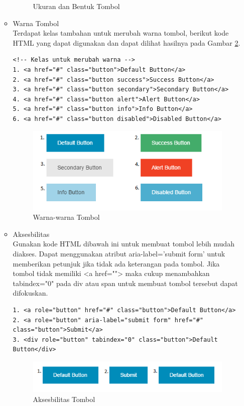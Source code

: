\begin{enumerate}[(1)]
\begin{itemize}
\begin{figure}[H]
\caption[Ukuran dan Bentuk Tombol]{Ukuran dan Bentuk Tombol}
\label{fig:ukurantombol}
\end{figure}
\item Warna Tombol\\
Terdapat kelas tambahan untuk merubah warna tombol, berikut kode HTML yang dapat digunakan dan dapat dilihat hasilnya pada Gambar \ref{fig:warnatombol}.
\begin{lstlisting}[basicstyle=\footnotesize]
<!-- Kelas untuk merubah warna -->
1. <a href="#" class="button">Default Button</a>
2. <a href="#" class="button success">Success Button</a>
3. <a href="#" class="button secondary">Secondary Button</a>
4. <a href="#" class="button alert">Alert Button</a>
5. <a href="#" class="button info">Info Button</a>
6. <a href="#" class="button disabled">Disabled Button</a>
\end{lstlisting}
\begin{figure}[H]
\centering
\includegraphics[scale=1]{Gambar/warnatombol.png}
\caption[Warna-warna Tombol]{Warna-warna Tombol}
\label{fig:warnatombol}
\end{figure}
\item Aksesbilitas\\
Gunakan kode HTML dibawah ini untuk membuat tombol lebih mudah diakses. Dapat menggunakan atribut aria-label='submit form' untuk memberikan petunjuk jika tidak ada keterangan pada tombol. Jika tombol tidak memiliki <a href=""> maka cukup menambahkan tabindex="0" pada div atau span untuk membuat tombol tersebut dapat difokuskan.
\begin{lstlisting}[basicstyle=\footnotesize]
1. <a role="button" href="#" class="button">Default Button</a>
2. <a role="button" aria-label="submit form" href="#" class="button">Submit</a>
3. <div role="button" tabindex="0" class="button">Default Button</div>
\end{lstlisting}
\begin{figure}[H]
\centering
\includegraphics[scale=1]{Gambar/aksesbilitastombol.png}
\caption[Aksesbilitas Tombol]{Aksesbilitas Tombol}
\label{fig:aksesbilitastombol}
\end{figure}
\end{itemize}


\end{enumerate}
